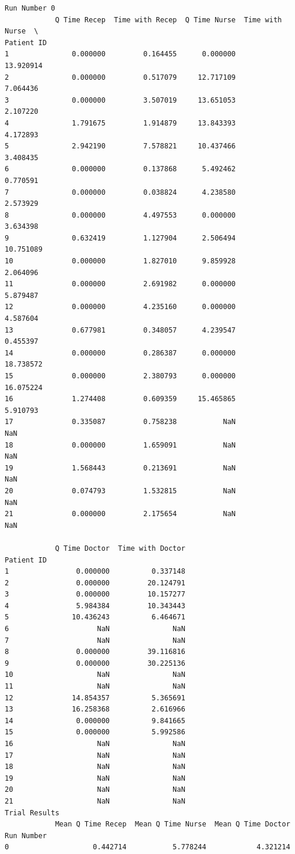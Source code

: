 \documentclass[
  letterpaper,
  DIV=11,
  numbers=noendperiod]{scrreprt}
\begin{document}
\begin{verbatim}
Run Number 0
            Q Time Recep  Time with Recep  Q Time Nurse  Time with Nurse  \
Patient ID                                                                 
1               0.000000         0.164455      0.000000        13.920914   
2               0.000000         0.517079     12.717109         7.064436   
3               0.000000         3.507019     13.651053         2.107220   
4               1.791675         1.914879     13.843393         4.172893   
5               2.942190         7.578821     10.437466         3.408435   
6               0.000000         0.137868      5.492462         0.770591   
7               0.000000         0.038824      4.238580         2.573929   
8               0.000000         4.497553      0.000000         3.634398   
9               0.632419         1.127904      2.506494        10.751089   
10              0.000000         1.827010      9.859928         2.064096   
11              0.000000         2.691982      0.000000         5.879487   
12              0.000000         4.235160      0.000000         4.587604   
13              0.677981         0.348057      4.239547         0.455397   
14              0.000000         0.286387      0.000000        18.738572   
15              0.000000         2.380793      0.000000        16.075224   
16              1.274408         0.609359     15.465865         5.910793   
17              0.335087         0.758238           NaN              NaN   
18              0.000000         1.659091           NaN              NaN   
19              1.568443         0.213691           NaN              NaN   
20              0.074793         1.532815           NaN              NaN   
21              0.000000         2.175654           NaN              NaN   

            Q Time Doctor  Time with Doctor  
Patient ID                                   
1                0.000000          0.337148  
2                0.000000         20.124791  
3                0.000000         10.157277  
4                5.984384         10.343443  
5               10.436243          6.464671  
6                     NaN               NaN  
7                     NaN               NaN  
8                0.000000         39.116816  
9                0.000000         30.225136  
10                    NaN               NaN  
11                    NaN               NaN  
12              14.854357          5.365691  
13              16.258368          2.616966  
14               0.000000          9.841665  
15               0.000000          5.992586  
16                    NaN               NaN  
17                    NaN               NaN  
18                    NaN               NaN  
19                    NaN               NaN  
20                    NaN               NaN  
21                    NaN               NaN  
Trial Results
            Mean Q Time Recep  Mean Q Time Nurse  Mean Q Time Doctor
Run Number                                                          
0                    0.442714           5.778244            4.321214
\end{verbatim}
\end{document}
